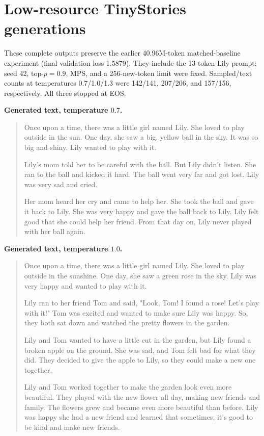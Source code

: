 \clearpage
{}
\section{Low-resource TinyStories generations}
\label{app:low_resource_samples}

These complete outputs preserve the earlier 40.96M-token matched-baseline
experiment (final validation loss 1.5879). They include the 13-token Lily
prompt; seed 42, top-$p=0.9$, MPS, and a 256-new-token limit were fixed.
Sampled/text counts at temperatures 0.7/1.0/1.3 were 142/141, 207/206, and
157/156, respectively. All three stopped at EOS.

\textbf{Generated text, temperature $0.7$.}
\begin{quote}
Once upon a time, there was a little girl named Lily. She loved to play outside in the sun. One day, she saw a big, yellow ball in the sky. It was so big and shiny. Lily wanted to play with it.

Lily's mom told her to be careful with the ball. But Lily didn't listen. She ran to the ball and kicked it hard. The ball went very far and got lost. Lily was very sad and cried.

Her mom heard her cry and came to help her. She took the ball and gave it back to Lily. She was very happy and gave the ball back to Lily. Lily felt good that she could help her friend. From that day on, Lily never played with her ball again.
\end{quote}

\textbf{Generated text, temperature $1.0$.}
\begin{quote}
Once upon a time, there was a little girl named Lily. She loved to play outside in the sunshine. One day, she saw a green rose in the sky. Lily was very happy and wanted to play with it.

Lily ran to her friend Tom and said, "Look, Tom! I found a rose! Let's play with it!" Tom was excited and wanted to make sure Lily was happy. So, they both sat down and watched the pretty flowers in the garden.

Lily and Tom wanted to have a little cut in the garden, but Lily found a broken apple on the ground. She was sad, and Tom felt bad for what they did. They decided to give the apple to Lily, so they could make a new one together.

Lily and Tom worked together to make the garden look even more beautiful. They played with the new flower all day, making new friends and family. The flowers grew and became even more beautiful than before. Lily was happy she had a new friend and learned that sometimes, it's good to be kind and make new friends.
\end{quote}

